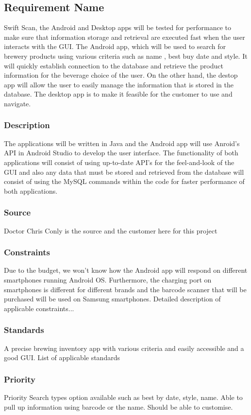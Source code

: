 \subsection{Requirement Name}
Swift Scan, the Android and Desktop apps will be tested for performance to make sure that information storage and retrieval are executed fast when the user interacts with the GUI. The Android app, which will be used to search for brewery products using various criteria such as name , best buy date and style. It will  quickly establish connection to the database and retrieve the product information for the beverage choice of the user.  On the other hand, the destop app will allow the user to easily manage the information that is stored in the database. The desktop app is to make it feasible for the customer to use and navigate. 
\subsubsection{Description}
The applications will be written in Java and the Android app will use Anroid's API in Android Studio to develop the user interface.  The functionality of both applications will consist of using up-to-date API's for the feel-and-look of the GUI and also any data that must be stored and retrieved from the database will consist of using the MySQL commands within the code for faster performance of both applications. 
\subsubsection{Source}
Doctor Chris Conly is the source and the customer here for this project
\subsubsection{Constraints}
Due to the budget, we won't know how the Android app will respond on different smartphones running Android OS.  Furthermore, the charging port on smartphones is different for different brands and the barcode scanner that will be purchased will be used on Samsung smartphones.
Detailed description of applicable constraints...
\subsubsection{Standards}
A precise brewing inventory app with various criteria and easily accessible and a good GUI.
List of applicable standards
\subsubsection{Priority}
Priority
Search types option available such as best by date, style, name.
Able to pull up information using barcode or the name.
Should be able to customise.
